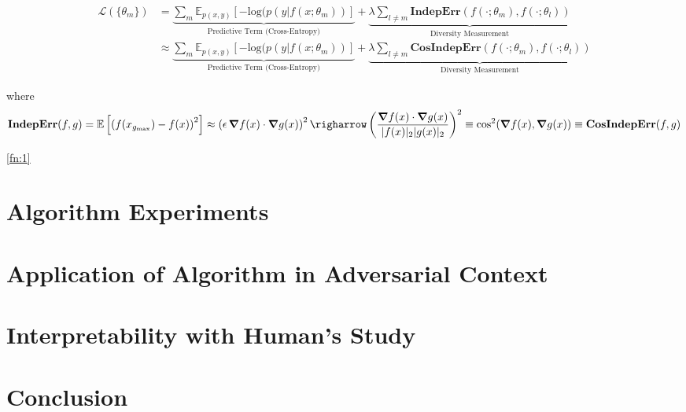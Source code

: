 \documentclass[twoside,11pt]{article}
\begin{document}
\begin{align}
\mathcal{L}(\{ \theta_m \}) & = \underbrace{\sum_m \mathbb{E}_{p(x,y)} \left[ - \text{log}(p(y|f(x; \theta_m))\right]}_\text{Predictive Term (Cross-Entropy)} + \underbrace{\lambda\sum_{l\neq m}\textbf{IndepErr}\left(f(\cdot ;\theta_m), f(\cdot ; \theta_l)\right)}_\text{Diversity Measurement} \label{fn:2}\\
&\approx \underbrace{\sum_m \mathbb{E}_{p(x,y)} \left[ - \text{log}(p(y|f(x; \theta_m))\right]}_\text{Predictive Term (Cross-Entropy)} + \underbrace{\lambda\sum_{l\neq m}\textbf{CosIndepErr}\left(f(\cdot ;\theta_m), f(\cdot ; \theta_l)\right)}_\text{Diversity Measurement} \label{fn:3}
\end{align}

where
\begin{align*}
\textbf{IndepErr}(f,g) = \mathbb{E}\left[\left(f(x_{g_\text{max}}) - f(x)\right)^2\right] \approx \left(\epsilon \, \grad{f(x)} \cdot \grad{g(x)}\right)^2 \righarrow \left(\frac{\grad{f(x)} \cdot \grad{g(x)}}{|f(x)|_2 |g(x)|_2}\right)^2 \equiv \cos[2](\grad{f(x)}, \grad{g(x)}) \equiv \textbf{CosIndepErr}(f,g)
\end{align*}

\cref{fn:1}

\section{Algorithm Experiments}


\section{Application of Algorithm in Adversarial Context}


\section{Interpretability with Human's Study}


\section{Conclusion}


\vskip 0.2in

\end{document}
